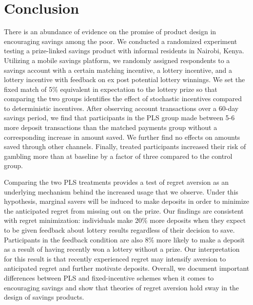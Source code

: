 \documentclass[12pt]{article}
\begin{document}
		

		

\section{Conclusion} \label{sec:conclusion}

	There is an abundance of evidence on the promise of product design in encouraging savings among the poor. We conducted a randomized experiment testing a prize-linked savings product with informal residents in Nairobi, Kenya. Utilizing a mobile savings platform, we randomly assigned respondents to a savings account with a certain matching incentive, a lottery incentive, and a lottery incentive with feedback on ex post potential lottery winnings. We set the fixed match of 5\% equivalent in expectation to the lottery prize so that comparing the two groups identifies the effect of stochastic incentives compared to deterministic incentives. After observing account transactions over a 60-day savings period, we find that participants in the PLS group made between 5-6 more deposit transactions than the matched payments group without a corresponding increase in amount saved. We further find no effects on amounts saved through other channels. Finally, treated participants increased their risk of gambling more than at baseline by a factor of three compared to the control group.

	Comparing the two PLS treatments provides a test of regret aversion as an underlying mechanism behind the increased usage that we observe. Under this hypothesis, marginal savers will be induced to make deposits in order to minimize the anticipated regret from missing out on the prize. Our findings are consistent with regret minimization: individuals make 20\% more deposits when they expect to be given feedback about lottery results regardless of their decision to save. Participants in the feedback condition are also 8\% more likely to make a deposit as a result of having recently won a lottery without a prize. Our interpretation for this result is that recently experienced regret may intensify aversion to anticipated regret and further motivate deposits. Overall, we document important differences between PLS and fixed-incentive schemes when it comes to encouraging savings and show that theories of regret aversion hold sway in the design of savings products.
\end{document}
